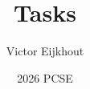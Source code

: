 \documentclass[10pt]{beamer}
\begin{document}
\author[Eijkhout]{Victor Eijkhout}
\date[2026]{2026 PCSE}
\title[tasks]{Tasks}
\maketitle


\end{document}
